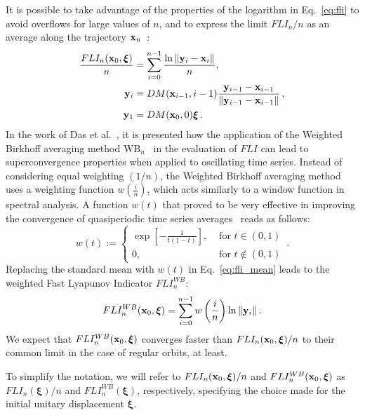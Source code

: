 It is possible to take advantage of the properties of the logarithm in Eq.~\eqref{eq:fli} to avoid overflows for large values of $n$, and to express the limit $FLI_n/n$ as an average along the trajectory ${\bf x}_n$~\cite{Alligood1996}:
%
\begin{equation}
\begin{aligned}
    \frac{FLI_n(\vb{x}_0, \boldsymbol{\xi})}{n} &= \sum_{i=0}^{n-1} \frac{\ln{\norm{\vb{y}_i-\vb{x}_i}}}{n},\\ 
    \vb{y}_i &= DM(\vb{x}_{i-1}, i-1)\frac{\vb{y}_{i-1}-\vb{x}_{i-1}}{\norm{\vb{y}_{i-1}-\vb{x}_{i-1}}} \,,\\
    \vb{y}_1 &= DM(\vb{x}_0, 0)\boldsymbol{\xi}\,.
    \label{eq:fli_mean}
\end{aligned}
\end{equation}
%
In the work of Das et al.~\cite{Das_2017}, it is presented how the application of the Weighted Birkhoff averaging method $\mathrm{WB}_n$~\cite{Das_2018} in the evaluation of $FLI$ can lead to superconvergence properties when applied to oscillating time series. Instead of considering equal weighting $(1/n)$, the Weighted Birkhoff averaging method uses a weighting function $w\left(\frac{i}{n}\right)$, which acts similarly to a window function in spectral analysis. A function $w(t)$ that proved to be very effective in improving the convergence of quasiperiodic time series averages~\cite{Das_2018} reads as follows:
%
\begin{equation}
    w(t):= 
    \begin{cases}
        \exp \left[-\frac{1}{t(1-t)}\right], & \text { for } t \in(0,1) \\ 
        0, & \text { for } t \notin(0,1)
    \end{cases} \,.
    \label{eq:birkhoff}
\end{equation}
%
Replacing the standard mean with $w(t)$ in Eq.~\eqref{eq:fli_mean} leads to the weighted Fast Lyapunov Indicator $FLI_n^{WB}$:
%
\begin{equation}
    FLI_n^{WB}(\vb{x}_0, \boldsymbol{\xi}) = \sum_{i=0}^{n-1} w\left(\frac{i}{n}\right) \ln{\norm{\vb{y}_i}} \, .
    \label{eq:fli_birkhoff}
\end{equation}
%
We expect that $FLI_n^{WB}(\vb{x}_0, \boldsymbol{\xi})$ converges faster than $FLI_n(\vb{x}_0, \boldsymbol{\xi})/n$ to their common limit in the case of regular orbits, at least.

To simplify the notation, we will refer to $FLI_n(\vb{x}_0, \boldsymbol{\xi})/n$ and $FLI_n^{WB}(\vb{x}_0, \boldsymbol{\xi})$ as $FLI_n(\boldsymbol{\xi})/n$ and $FLI_n^{WB}(\boldsymbol{\xi})$, respectively, specifying the choice made for the initial unitary displacement $\boldsymbol{\xi}$. 
%
